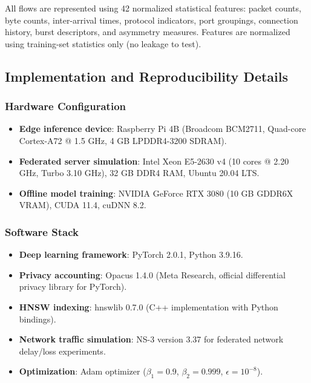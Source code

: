 \documentclass[preprint,12pt]{elsarticle}
\begin{document}
All flows are represented using 42 normalized statistical features: packet counts, byte counts, inter-arrival times, protocol indicators, port groupings, connection history, burst descriptors, and asymmetry measures. Features are normalized using training-set statistics only (no leakage to test).

\subsection{Implementation and Reproducibility Details}

\subsubsection{Hardware Configuration}

\begin{itemize}[leftmargin=1.2em]
    \item \textbf{Edge inference device}: Raspberry Pi 4B (Broadcom BCM2711, Quad-core Cortex-A72 @ 1.5 GHz, 4 GB LPDDR4-3200 SDRAM).
    \item \textbf{Federated server simulation}: Intel Xeon E5-2630 v4 (10 cores @ 2.20 GHz, Turbo 3.10 GHz), 32 GB DDR4 RAM, Ubuntu 20.04 LTS.
    \item \textbf{Offline model training}: NVIDIA GeForce RTX 3080 (10 GB GDDR6X VRAM), CUDA 11.4, cuDNN 8.2.
\end{itemize}

\subsubsection{Software Stack}

\begin{itemize}[leftmargin=1.2em]
    \item \textbf{Deep learning framework}: PyTorch 2.0.1, Python 3.9.16.
    \item \textbf{Privacy accounting}: Opacus 1.4.0 (Meta Research, official differential privacy library for PyTorch).
    \item \textbf{HNSW indexing}: hnswlib 0.7.0 (C++ implementation with Python bindings).
    \item \textbf{Network traffic simulation}: NS-3 version 3.37 for federated network delay/loss experiments.
    \item \textbf{Optimization}: Adam optimizer ($\beta_1 = 0.9$, $\beta_2 = 0.999$, $\epsilon = 10^{-8}$).
\end{itemize}
\end{document}
